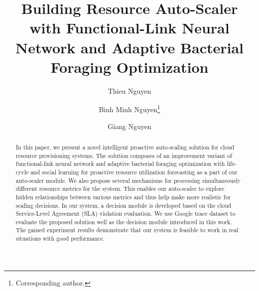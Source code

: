 \documentclass[runningheads]{llncs}
\begin{document}
%
\title{Building Resource Auto-Scaler with Functional-Link Neural Network and Adaptive Bacterial Foraging Optimization}
%



\author{Thieu Nguyen	\and
Binh Minh Nguyen\thanks{Corresponding author.} \and 
Giang Nguyen}
%



%
\maketitle              %
%



\begin{abstract}

In this paper, we present a novel intelligent proactive auto-scaling solution for cloud resource provisioning systems. The solution composes of an improvement variant of functional-link neural network and adaptive bacterial foraging optimization with life-cycle and social learning
for proactive resource utilization forecasting as a part of our auto-scaler module. We also propose several mechanisms for processing simultaneously different resource metrics for the system. This enables our auto-scaler to explore hidden relationships between various metrics and thus help make more realistic for scaling decisions. In our system, a decision module is developed based on the cloud Service-Level Agreement (SLA) violation evaluation. We use Google trace dataset to evaluate the proposed solution well as the decision module introduced in this work. The gained experiment results demonstrate that our system is feasible to work in real situations with good performance.

\end{abstract}
\end{document}
